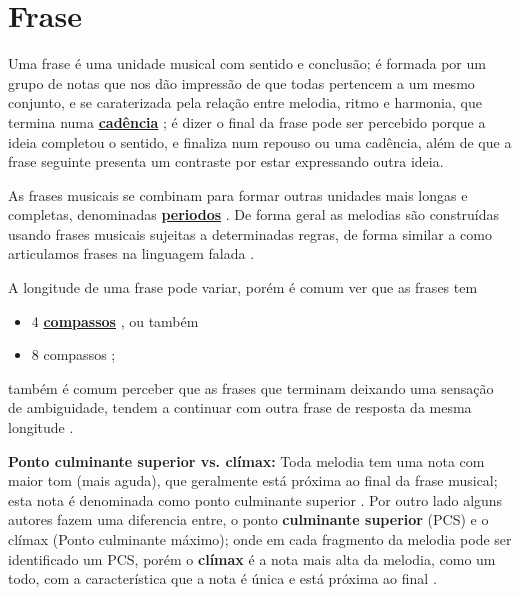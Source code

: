 \section{Frase}
\label{sec:Frase}
Uma frase é uma unidade musical com sentido e conclusão;
é formada por um grupo de notas que nos dão impressão de que todas pertencem a um mesmo conjunto,
e se caraterizada pela relação entre melodia, ritmo e harmonia,
que termina numa \hyperref[sec:Cadencia]{\textbf{cadência}} \cite[pp. 624]{latham2008diccionario} \cite[pp. 335]{medteoria} \cite[pp. 34]{bennett1993elementos};
é dizer o final da frase pode ser percebido porque a ideia completou o sentido, 
e finaliza num repouso ou uma cadência, além de que a frase seguinte presenta um contraste por estar expressando outra ideia.


As frases musicais se combinam para formar outras unidades mais longas e completas, 
denominadas \hyperref[sec:Periodo]{\textbf{periodos}} \cite[pp. 624]{latham2008diccionario}.
De forma geral as melodias são construídas usando frases musicais sujeitas a determinadas
regras, de forma similar a como articulamos frases na linguagem falada \cite[pp. 334]{medteoria}.


A longitude de uma frase pode variar, 
porém é comum ver que as frases tem
\begin{itemize}
\item 4 \hyperref[sec:compaso]{\textbf{compassos}} \cite[pp. 624]{latham2008diccionario} \cite[pp. 34]{bennett1993elementos}, 
ou também 
\item 8 compassos  \cite[pp. 335]{medteoria} \cite[pp. 34]{bennett1993elementos};
\end{itemize}
também é comum perceber que as frases que terminam deixando uma sensação de ambiguidade, 
tendem a continuar com outra frase de resposta da mesma longitude \cite[pp. 624]{latham2008diccionario}.


\begin{tcbinformation}
\label{ref:PontoCulminanteSuperior} 
\textbf{Ponto culminante superior vs. clímax:}
Toda melodia tem uma nota com maior tom (mais aguda), que geralmente está próxima ao final da frase musical;
esta nota é denominada como ponto culminante superior \cite[pp. 336]{medteoria}.
Por outro lado alguns autores fazem uma diferencia entre,
o ponto \textbf{culminante superior} (PCS) e o clímax (Ponto culminante máximo);
onde em cada fragmento da melodia pode ser identificado um PCS,
porém o \textbf{clímax} é a nota mais alta da melodia, como um todo, 
com a característica que a nota é única e está próxima ao final \cite[pp. 12]{melos2012} \cite{HARTMANN2013} \cite[pp. 50]{holland2013music}.
\label{ref:climax}
\end{tcbinformation} 

